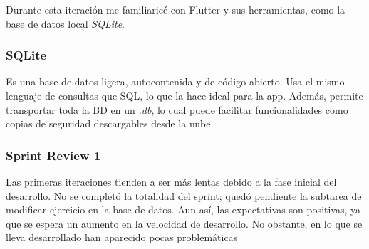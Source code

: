 Durante esta iteraci\'on me familiaric\'e con Flutter y sus herramientas, como la base de datos local \textit{SQLite}.

\subsubsection*{SQLite}
Es una base de datos ligera, autocontenida y de c\'odigo abierto. Usa el mismo lenguaje de consultas que SQL, lo que la hace ideal para la app. Adem\'as, permite transportar toda la BD en un \textit{.db}, lo cual puede facilitar funcionalidades como copias de seguridad descargables desde la nube.

\subsubsection*{Sprint Review 1}
Las primeras iteraciones tienden a ser m\'as lentas debido a la fase inicial del desarrollo. No se complet\'o la totalidad del sprint; qued\'o pendiente la subtarea de modificar ejercicio en la base de datos. Aun as\'i, las expectativas son positivas, ya que se espera un aumento en la velocidad de desarrollo. No obstante, en lo que se lleva  desarrollado han aparecido pocas problemáticas

